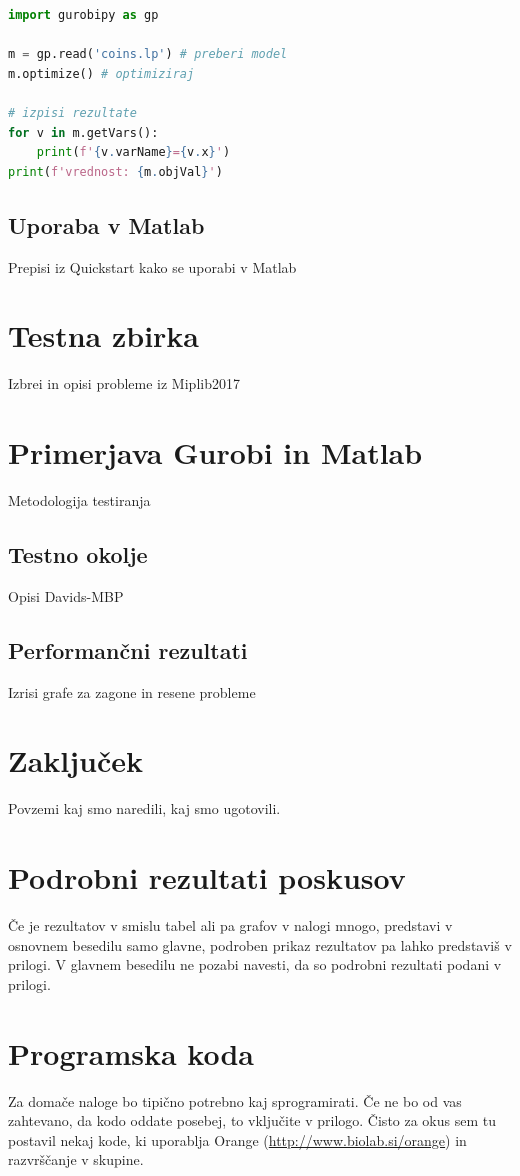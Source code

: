 \documentclass[a4paper,11pt]{article}
\begin{document}
\begin{lstlisting}[language=Python,caption=Primer uporabe LP formatov in gurobipy,label=code:gurobipy]
import gurobipy as gp

m = gp.read('coins.lp') # preberi model
m.optimize() # optimiziraj

# izpisi rezultate
for v in m.getVars(): 
    print(f'{v.varName}={v.x}')
print(f'vrednost: {m.objVal}')
\end{lstlisting}

\subsection{Uporaba v Matlab}
Prepisi iz Quickstart kako se uporabi v Matlab



\section{Testna zbirka}
\label{benchmark_data}
Izbrei in opisi probleme iz Miplib2017



\section{Primerjava Gurobi in Matlab}
Metodologija testiranja

\subsection{Testno okolje}
Opisi Davids-MBP

\subsection{Performančni rezultati}
Izrisi grafe za zagone in resene probleme

\section{Zaključek}
Povzemi kaj smo naredili, kaj smo ugotovili.

\appendix
\appendixpage
\section{\label{app-res}Podrobni rezultati poskusov}

Če je rezultatov v smislu tabel ali pa grafov v nalogi mnogo,
predstavi v osnovnem besedilu samo glavne, podroben prikaz
rezultatov pa lahko predstaviš v prilogi. V glavnem besedilu ne
pozabi navesti, da so podrobni rezultati podani v prilogi.

\section{\label{app-code}Programska koda}

Za domače naloge bo tipično potrebno kaj sprogramirati. Če ne bo od
vas zahtevano, da kodo oddate posebej, to vključite v prilogo. Čisto
za okus sem tu postavil nekaj kode, ki uporablja Orange
(\url{http://www.biolab.si/orange}) in razvrščanje v skupine.




\end{document}
